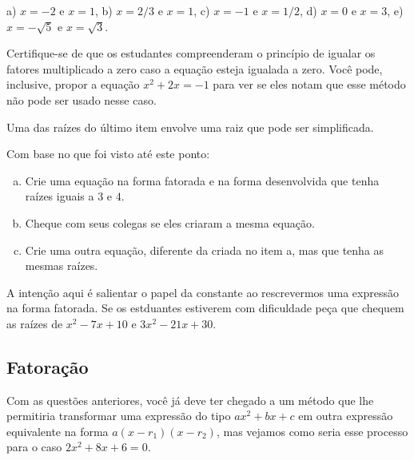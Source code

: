 \documentclass[main_estudante.tex]{subfiles}
\begin{document}
\begin{gabarito}
	\begin{gabaritoQuestao}
        a) $x=-2$ e $x=1$, b) $x=2/3$ e $x=1$, c) $x=-1$ e $x=1/2$, d) $x=0$ e $x=3$, e) $x=-\sqrt{5}$ e $x=\sqrt{3}$.
	\end{gabaritoQuestao}
\end{gabarito}

\paraTutores

Certifique-se de que os estudantes compreenderam o princípio de igualar os fatores multiplicado a zero caso a equação esteja igualada a zero. Você pode, inclusive, propor a equação $x^2+2x=-1$ para ver se eles notam que esse método não pode ser usado nesse caso.

Uma das raízes do último item envolve uma raiz que pode ser simplificada.

\paraAmbos

\begin{reflita}
Com base no que foi visto até este ponto:
\begin{enumerate}[a)]
\item Crie uma equação na forma fatorada e na forma desenvolvida que tenha raízes iguais a $3$ e $4$.
\item Cheque com seus colegas se eles criaram a mesma equação.
\item Crie uma outra equação, diferente da criada no item a, mas que tenha as mesmas raízes.
\end{enumerate}
\end{reflita}

\paraTutores

A intenção aqui é salientar o papel da constante ao rescrevermos uma expressão na forma fatorada. Se os estduantes estiverem com dificuldade peça que chequem as raízes de $x^2-7x+10$ e $3x^2-21x+30$.

\paraAmbos

\subsection*{Fatoração}

Com as questões anteriores, você já deve ter chegado a um método que lhe permitiria transformar uma expressão do tipo $ax^2+bx+c$ em outra expressão equivalente na forma $a(x-r_1)(x-r_2)$, mas vejamos como seria esse processo para o caso $2x^2+8x+6=0$.
\end{document}
